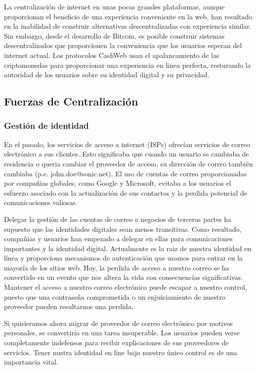 \documentclass{article}
\begin{document}
La centralización de internet en unas pocas grandes plataformas, aunque proporcionan el beneficio de una experiencia conveniente en la web, han resultado en la inabilidad de construir alternativas descentralizadas con experiencia similar. Sin embargo, desde el desarrollo de Bitcoin\supercite{nakamoto2008bpp}, es posible construir sistemas descentralizados que proporcionen la conveniencia que los usuarios esperan del internet actual. Los protocolos CashWeb usan el apalancamiento de las criptomonedas para proporcionar una experiencia en linea perfecta, resturando la autoridad de los usuarios sobre su identidad digital y su privacidad. 

\subsection{Fuerzas de Centralización}

\subsubsection{Gestión de identidad}

En el pasado, los servicios de acceso a internet (ISPs) ofrecían servicios de correo electrónico a sus clientes. Esto significaba que cuando un usuario se cambiaba de residencia o queria cambiar el proveedor de acceso, su dirección de correo también cambiaba (p.e. john.doe@sonic.net). El uso de cuentas de correo proporcianadas por compañias globales, como Google y Microsoft, evitaba a los usuarios el esfuerzo asociado con la actualización de sus contactos y la perdida potencial de comunicaciones valiosas.

Delegar la gestión de las cuentas de correo a negocios de terceras partes ha supuesto que las identidades digitales sean menos transitivas. Como resultado, compañias y usuarios han empezado a delegar en ellas para comunicaciones importantes y la identidad digital. Actualmente es la raiz de nuestra identidad en línea y proporciona mecanismos de autenticación que usamos para entrar en la mayoría de los sitios web. Hoy, la perdida de acceso a nuestro correo se ha convertido en un evento que nos altera la vida con consecuencías significativas. Mantener el acceso a nuestro correo electrónico puede escapar a nuestro control, puesto que una contraseña comprometida o un enjuiciamiento de nuestro proveedor pueden resultarnos una perdida. 

Si quisieramos ahora migrar de proveedor de correo electrónico por motivos personales, se convertiría en una tarea insuperable. Los usuarios pueden verse completamente indefensos para recibir explicaciones de sus proveedores de servicios. Tener nustra identidad en line bajo nuestro único control es de una importancia vital.
\end{document}
